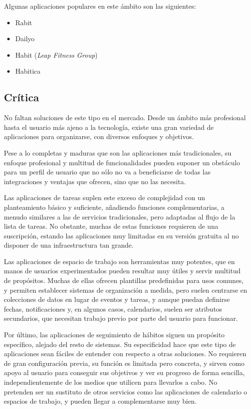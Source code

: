 \documentclass[10pt, a4paper]{aqademic}
\begin{document}
\medskip

Algunas aplicaciones populares en este ámbito son las siguientes:

\begin{itemize}
	\item Rabit
	\item Dailyo
	\item Habit (\textit{Leap Fitness Group})
	\item Habitica
\end{itemize}


\subsection*{Crítica}

No faltan soluciones de este tipo en el mercado. Desde un ámbito más profesional hasta el usuario más ajeno a la tecnología, existe una gran variedad de aplicaciones para organizarse, con diversos enfoques y objetivos. 

Pese a lo completas y maduras que son las aplicaciones más tradicionales, su enfoque profesional y multitud de funcionalidades pueden suponer un obstáculo para un perfil de usuario que no sólo no va a beneficiarse de todas las integraciones y ventajas que ofrecen, sino que no las necesita. 

\medskip

Las aplicaciones de tareas suplen este exceso de complejidad con un planteamiento básico y suficiente, añadiendo funciones complementarias, a menudo similares a las de servicios tradicionales, pero adaptadas al flujo de la lista de tareas. No obstante, muchas de estas funciones requieren de una suscripción, estando las aplicaciones muy limitadas en su versión gratuita al no disponer de una infraestructura tan grande. 

\medskip

Las aplicaciones de espacio de trabajo son herramientas muy potentes, que en manos de usuarios experimentados pueden resultar muy útiles y servir multitud de propósitos. Muchas de ellas ofrecen plantillas predefinidas para usos comunes, y permiten establecer sistemas de organización a medida, pero suelen centrarse en colecciones de datos en lugar de eventos y tareas, y aunque puedan definirse fechas, notificaciones y, en algunos casos, calendarios, suelen ser atributos secundarios, que necesitan trabajo previo por parte del usuario para funcionar.

\medskip

Por último, las aplicaciones de seguimiento de hábitos siguen un propósito específico, alejado del resto de sistemas. Su especificidad hace que este tipo de aplicaciones sean fáciles de entender con respecto a otras soluciones. No requieren de gran configuración previa, su función es limitada pero concreta, y sirven como apoyo al usuario para conseguir sus objetivos y ver su progreso de forma sencilla, independientemente de los medios que utilicen para llevarlos a cabo. No pretenden ser un sustituto de otros servicios como las aplicaciones de calendario o espacios de trabajo, y pueden llegar a complementarse muy bien.
\end{document}
